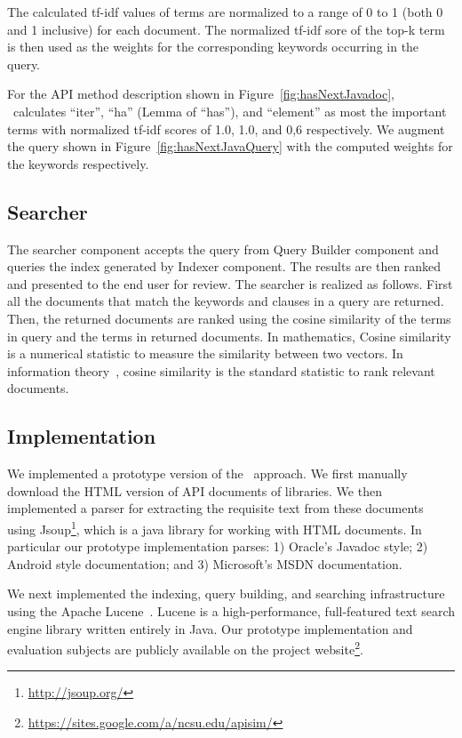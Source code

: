 The calculated tf-idf values of terms are normalized to a range of 0 to 1 (both 0 and 1 inclusive) for each document.
The normalized tf-idf sore of the top-k term is then used as the weights for the corresponding  keywords occurring in the query.

For the API method description  shown in Figure~\ref{fig:hasNextJavadoc}, \tool\ calculates ``iter'', ``ha'' (Lemma of ``has''), and ``element'' as most the important terms with normalized tf-idf scores of 1.0, 1.0, and 0,6 respectively. We augment the query shown in Figure~\ref{fig:hasNextJavaQuery} with the computed weights for the keywords respectively.

\subsection{Searcher}
\label{sub:approach_searcher}

The searcher component accepts the query from Query Builder component and queries the index generated by Indexer component.
The results are then ranked and presented to the end user for review.
The searcher is realized as follows. 
First all the documents that match the keywords and clauses in a query are returned.
Then, the returned documents are ranked using the cosine similarity\cite{singhal2001modern} of the terms in query and the terms in returned documents. In mathematics, Cosine similarity is a numerical statistic to measure the similarity between two vectors. 
In information theory~\cite{manning2008introduction}, cosine similarity is the standard statistic to rank relevant documents.




    


\subsection{Implementation}
\label{sub:Approach_implementation}

We implemented a prototype version of the \tool\ approach.
We first manually download the HTML version of API documents of libraries. 
We then implemented a parser for extracting the requisite text from these documents using 
Jsoup\footnote{\url{http://jsoup.org/}}, which is a java library for working with HTML documents.
In particular our prototype implementation parses: 
1) Oracle's Javadoc style;
2) Android style documentation; and
3) Microsoft's  MSDN documentation.

We next implemented the indexing, query building, and searching infrastructure using the Apache Lucene~\cite{lucene}.
Lucene is a high-performance, full-featured text search engine library written entirely in Java.
Our prototype implementation and evaluation subjects are publicly available on the project website\footnote{\url{https://sites.google.com/a/ncsu.edu/apisim/}}. 
